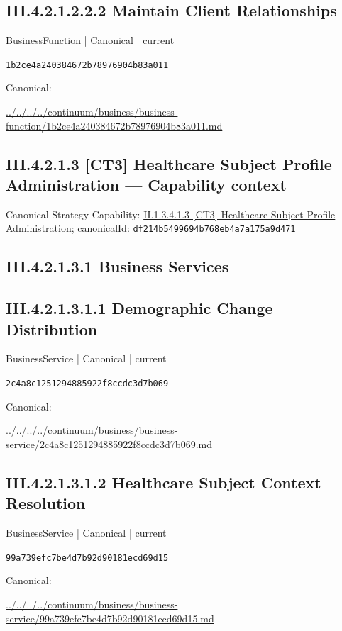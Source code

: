 \documentclass[10pt,a4paper]{article}
\begin{document}
\subsection*{III.4.2.1.2.2.2 Maintain Client Relationships}
\label{element-1b2ce4a240384672b78976904b83a011}
{\small BusinessFunction | Canonical | current}\par
\texttt{1b2ce4a240384672b78976904b83a011}\par
Canonical: \par
{\footnotesize\url{../../../../continuum/business/business-function/1b2ce4a240384672b78976904b83a011.md}}\par
\subsection*{III.4.2.1.3 [CT3] Healthcare Subject Profile Administration — Capability context}
Canonical Strategy Capability: \hyperref[element-df214b5499694b768eb4a7a175a9d471]{II.1.3.4.1.3 [CT3] Healthcare Subject Profile Administration}; canonicalId: \texttt{df214b5499694b768eb4a7a175a9d471}\par
\subsection*{III.4.2.1.3.1 Business Services}
\subsection*{III.4.2.1.3.1.1 Demographic Change Distribution}
\label{element-2c4a8c1251294885922f8ccdc3d7b069}
{\small BusinessService | Canonical | current}\par
\texttt{2c4a8c1251294885922f8ccdc3d7b069}\par
Canonical: \par
{\footnotesize\url{../../../../continuum/business/business-service/2c4a8c1251294885922f8ccdc3d7b069.md}}\par
\subsection*{III.4.2.1.3.1.2 Healthcare Subject Context Resolution}
\label{element-99a739efc7be4d7b92d90181ecd69d15}
{\small BusinessService | Canonical | current}\par
\texttt{99a739efc7be4d7b92d90181ecd69d15}\par
Canonical: \par
{\footnotesize\url{../../../../continuum/business/business-service/99a739efc7be4d7b92d90181ecd69d15.md}}\par
\end{document}

